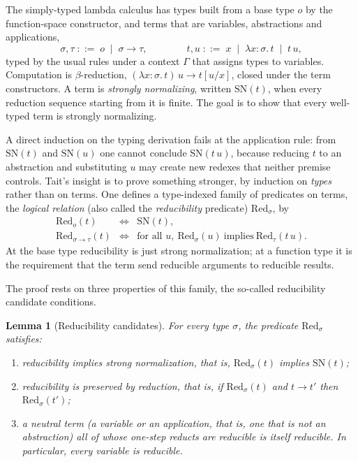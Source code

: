 \documentclass[preprint,12pt]{elsarticle}
\newtheorem{Lemma}{Lemma}
\theoremstyle{definition}
\begin{document}
The simply-typed lambda calculus has types built from a base type $o$ by the
function-space constructor, and terms that are variables, abstractions and
applications,
\[
  \sigma, \tau \;::=\; o \;\mid\; \sigma \to \tau,
  \qquad\qquad
  t, u \;::=\; x \;\mid\; \lambda x{:}\sigma.\,t \;\mid\; t\,u,
\]
typed by the usual rules under a context $\Gamma$ that assigns types to variables.
Computation is $\beta$-reduction, $(\lambda x{:}\sigma.\,t)\,u \to t[u/x]$, closed
under the term constructors. A term is \emph{strongly normalizing}, written
$\mathrm{SN}(t)$, when every reduction sequence starting from it is finite. The
goal is to show that every well-typed term is strongly normalizing.

A direct induction on the typing derivation fails at the application rule: from
$\mathrm{SN}(t)$ and $\mathrm{SN}(u)$ one cannot conclude $\mathrm{SN}(t\,u)$,
because reducing $t$ to an abstraction and substituting $u$ may create new redexes
that neither premise controls. Tait's insight is to prove something stronger, by
induction on \emph{types} rather than on terms. One defines a type-indexed family
of predicates on terms, the \emph{logical relation} (also called the
\emph{reducibility} predicate) $\mathrm{Red}_\sigma$, by
\[
  \begin{array}{lcl}
    \mathrm{Red}_{o}(t)             & \iff & \mathrm{SN}(t),\\
    \mathrm{Red}_{\sigma\to\tau}(t) & \iff & \text{for all } u,\ \mathrm{Red}_\sigma(u)\ \text{implies}\ \mathrm{Red}_\tau(t\,u).
  \end{array}
\]
At the base type reducibility is just strong normalization; at a function type it
is the requirement that the term send reducible arguments to reducible results.

The proof rests on three properties of this family, the so-called reducibility
candidate conditions.

\begin{Lemma}[Reducibility candidates]\label{lem:cr}
For every type $\sigma$, the predicate $\mathrm{Red}_\sigma$ satisfies:
\begin{enumerate}
  \item[(CR1)] reducibility implies strong normalization, that is,
    $\mathrm{Red}_\sigma(t)$ implies $\mathrm{SN}(t)$;
  \item[(CR2)] reducibility is preserved by reduction, that is, if
    $\mathrm{Red}_\sigma(t)$ and $t \to t'$ then $\mathrm{Red}_\sigma(t')$;
  \item[(CR3)] a \emph{neutral} term (a variable or an application, that is, one
    that is not an abstraction) all of whose one-step reducts are reducible is
    itself reducible. In particular, every variable is reducible.
\end{enumerate}
\end{Lemma}
\end{document}
